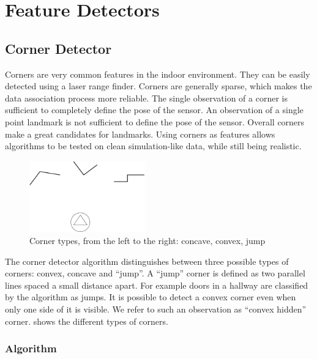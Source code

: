 

\section{Feature Detectors}

\subsection{Corner Detector}

Corners are very common features in the indoor environment. They can
be easily detected using a laser range finder. Corners are generally
sparse, which makes the data association process more reliable. The
single observation of a corner is sufficient to completely define the
pose of the sensor. An observation of a single point landmark is not
sufficient to define the pose of the sensor. Overall corners make a
great candidates for landmarks. Using corners as features allows
algorithms to be tested on clean simulation-like data, while still
being realistic.


\begin{figure}[htbp]
  \centering
  \includegraphics[width=5cm]{Pics/fig_corner_types}
  \caption[Types of corner features]{Corner types, from the left to the right: concave, convex,
  jump}
  \label{fig:corner_types}
\end{figure}

The corner detector algorithm distinguishes between three possible
types of corners: convex, concave and ``jump''. A ``jump'' corner is
defined as two parallel lines spaced a small distance apart. For
example doors in a hallway are classified by the algorithm as jumps.
It is possible to detect a convex corner even when only one side of it
is visible. We refer to such an observation as ``convex hidden''
corner.  shows the different types of
corners.


\subsubsection{Algorithm}

